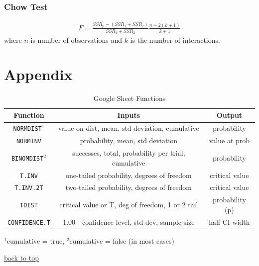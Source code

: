 \documentclass[12pt]{article}
\numberwithin{equation}{section}
\begin{document}
\subsubsection{Chow Test}
\begin{gather}
    F = \frac{SSR_p - (SSR_1 + SSR_2)}{SSR_1 + SSR_2} \frac{n - 2(k+1)}{k+1}
\end{gather}
where $n$ is number of observations and $k$ is the number of interactions.

\section{Appendix}
\label{sec:appendix}

\begin{table}[!ht]
    \centering
    \footnotesize
    \begin{tabular}{c|c c}
        Function                &   Inputs  &   Output \\ \hline
        \verb|NORMDIST|$^1$     &   value on dist, mean, std deviation, cumulative  & probability   \\
        \verb|NORMINV|          &   probability, mean, std deviation            &   value at prob \\
        \verb|BINOMDIST|$^2$    &   successes, total, probability per trial, cumulative   &   probability \\
        \verb|T.INV|            &   one-tailed probability, degrees of freedom  &   critical value \\
        \verb|T.INV.2T|         &   two-tailed probability, degrees of freedom  &   critical value \\
        \verb|TDIST|            &   critical value or T, deg of freedom, 1 or 2 tail    &  probability (p) \\
        \verb|CONFIDENCE.T|     &   1.00 - confidence level, std dev, sample size    &   half CI width \\
    \end{tabular}
    \label{tab:sheet_functions}
    \caption{Google Sheet Functions}
\end{table}
\footnotesize{$^1$cumulative = true, $^2$cumulative = false (in most cases)}


\normalsize
\begin{flushright} \hyperref[sec:top]{back to top} \end{flushright}
\end{document}
